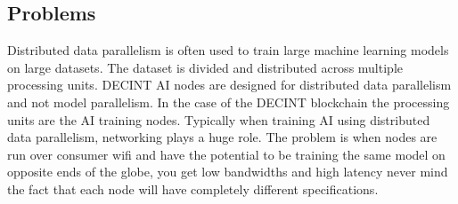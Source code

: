 \documentclass[11pt]{article}
\begin{document}
\subsection{Problems}
Distributed data parallelism is often used to train large machine learning models on large datasets. The dataset is divided and distributed across multiple processing units. DECINT AI nodes are designed for distributed data parallelism and not model parallelism. In the case of the DECINT blockchain the processing units are the AI training nodes. Typically when training AI using distributed data parallelism, networking plays a huge role. The problem is when nodes are run over consumer wifi and have the potential to be training the same model on opposite ends of the globe, you get low bandwidths and high latency never mind the fact that each node will have completely different specifications.





\end{document}
